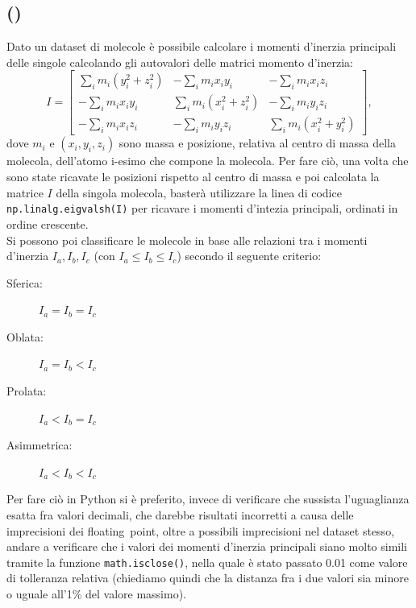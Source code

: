 \documentclass[a4paper]{article}
\newcounter{count_es}
\newcounter{count_sub_es}[count_es]
\begin{document}
\subsection*{ ()}
Dato un dataset di molecole è possibile calcolare i momenti d'inerzia
principali delle singole calcolando gli autovalori delle matrici momento d'inerzia:
\[ I = \begin{bmatrix}
            \displaystyle\sum_{i}^{} m_{i}(y_{i}^{2} + z_{i}^{2}) & -\displaystyle\sum_{i}^{} m_{i} x_{i} y_{i}  & -\displaystyle\sum_{i}^{} m_{i} x_{i} z_{i}\\
            -\displaystyle\sum_{i}^{} m_{i} x_{i} y_{i} & \displaystyle\sum_{i}^{} m_{i}(x_{i}^{2} + z_{i}^{2}) & -\displaystyle\sum_{i}^{} m_{i} y_{i} z_{i}\\
            -\displaystyle\sum_{i}^{} m_{i} x_{i} z_{i} & -\displaystyle\sum_{i}^{} m_{i} y_{i} z_{i} & \displaystyle\sum_{i}^{} m_{i}(x_{i}^{2} + y_{i}^{2})
        \end{bmatrix}, \]
dove \(m_{i}\) e \((x_{i}, y_{i}, z_{i})\) sono massa e posizione, relativa al centro di massa 
della molecola, dell'atomo i-esimo che compone la molecola. Per fare ciò, una volta che sono state
ricavate le posizioni rispetto al centro di massa e poi calcolata la matrice \(I\) della singola molecola,
basterà utilizzare la linea di codice \lstinline{np.linalg.eigvalsh(I)} per ricavare i momenti d'intezia
principali, ordinati in ordine crescente. \\
Si possono poi classificare le molecole in base alle relazioni tra i momenti d'inerzia \(I_{a}, I_{b}, I_{c}\) (con \(I_{a} \leq I_{b} \leq I_{c}\)) secondo 
il seguente criterio:
\begin{description}
    \item [Sferica:] \(I_{a} = I_{b} = I_{c}\) 
    \item [Oblata:] \(I_{a} = I_{b} < I_{c}\) 
    \item [Prolata:] \(I_{a} < I_{b} = I_{c}\) 
    \item [Asimmetrica:] \(I_{a} < I_{b} < I_{c}\) 
\end{description}
Per fare ciò in Python si è preferito, invece di verificare che sussista l'uguaglianza esatta fra valori decimali, 
che darebbe risultati incorretti a causa delle imprecisioni dei floating~point, oltre a possibili imprecisioni nel dataset stesso,
andare a verificare che i valori dei momenti d'inerzia principali siano molto simili tramite la funzione \lstinline{math.isclose()}, nella quale
è stato passato 0.01 come valore di tolleranza relativa (chiediamo quindi che la distanza fra i due valori sia minore o uguale all'1\% del valore massimo). \\
\end{document}
